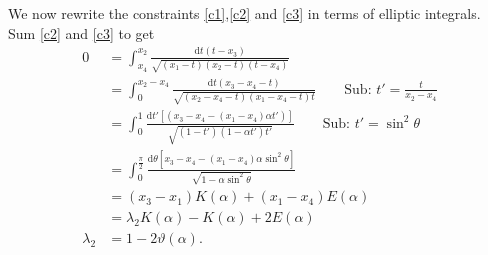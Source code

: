\documentclass[10pt]{article}
\newcommand{\dif}{\mathrm{d}}
\theoremstyle{plain}
\theoremstyle{definition}
\theoremstyle{plain}
\begin{document}
We now rewrite the constraints \ref{c1},\ref{c2} and \ref{c3} in terms of elliptic integrals. Sum \ref{c2} and \ref{c3} to get
\begin{align}
	0 &= \int_{x_4}^{x_2} \frac{\dif t (t-x_3)}{\sqrt{(x_1-t)(x_2 - t)(t-x_4)}} \nonumber \\
	&= \int_0^{x_2-x_4} \frac{\dif t (x_3-x_4-t)}{\sqrt{(x_2-x_4-t)(x_1-x_4-t)t}} \qquad \text{Sub: } t' = \frac{t}{x_2-x_4} \nonumber \\
	&= \int_0^1 \frac{\dif t' [(x_3-x_4 - (x_1-x_4)\alpha t') ]}{\sqrt{(1-t')(1-\alpha t')t'}} \qquad\text{Sub: } t' = \sin^2\theta \nonumber \\
	&= \int_0^{\frac{\pi}{2}} \frac{\dif\theta [x_3-x_4 - (x_1-x_4)\alpha\sin^2\theta]}{\sqrt{1-\alpha\sin^2\theta}} \nonumber \\
	&= (x_3-x_1)K(\alpha) + (x_1-x_4)E(\alpha) \nonumber\\
	&= \lambda_2 K(\alpha) - K(\alpha) + 2E(\alpha) \nonumber\\
	\lambda_2 &= 1-2\vartheta(\alpha). \label{ellipticeq2}
\end{align}
\end{document}
